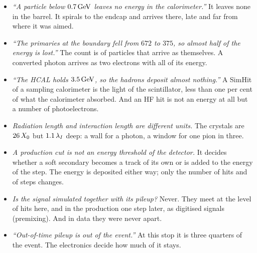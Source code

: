 \begin{pitfalls}
\begin{itemize}[nosep]
  \item \emph{``A particle below $0.7\,\mathrm{GeV}$ leaves no energy in the
    calorimeter.''} It leaves none in the barrel. It spirals to the endcap
    and arrives there, late and far from where it was aimed.
  \item \emph{``The primaries at the boundary fell from $672$ to $375$, so
    almost half of the energy is lost.''} The count is of particles that arrive
    as themselves. A converted photon arrives as two electrons with all of
    its energy.
  \item \emph{``The HCAL holds $3.5\,\mathrm{GeV}$, so the hadrons deposit almost
    nothing.''} A SimHit of a sampling calorimeter is the light of the
    scintillator, less than one per cent of what the calorimeter absorbed. And an HF
    hit is not an energy at all but a number of photoelectrons.
  \item \emph{Radiation length and interaction length are different units.}
    The crystals are $26\,X_0$ but $1.1\,\lambda_I$ deep: a wall for a
    photon, a window for one pion in three.
  \item \emph{A production cut is not an energy threshold of the detector.}
    It decides whether a soft secondary becomes a track of its own or is
    added to the energy of the step. The energy is deposited either way;
    only the number of hits and of steps changes.
  \item \emph{Is the signal simulated together with its pileup?} Never. They
    meet at the level of hits here, and in the production one step later,
    as digitised signals (premixing). And in data they were never apart.
  \item \emph{``Out-of-time pileup is out of the event.''} At this stop it
    is three quarters of the event. The electronics decide how much of it
    stays.
\end{itemize}
\end{pitfalls}

